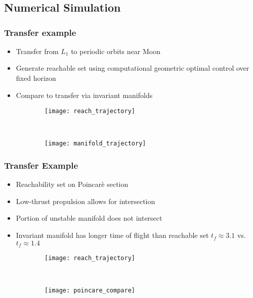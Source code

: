 \section*{}
\subsection*{Numerical Simulation}
\begin{frame} %
\frametitle{Transfer example}
\begin{itemize}
	\item Transfer from \( L_1 \) to periodic orbits near Moon
	\item Generate reachable set using computational geometric optimal control over fixed horizon
	\item Compare to transfer via invariant manifolds
\end{itemize}
	\begin{figure} 
	\centering 
	\begin{subfigure}[htbp]{0.5\textwidth} 
		\texttt{[image: reach\_trajectory]}  
	\end{subfigure}~
	\begin{subfigure}[htbp]{0.5\textwidth} 
		\texttt{[image: manifold\_trajectory]} 
	\end{subfigure} 
	\end{figure}
\end{frame} %

\begin{frame}%
\frametitle{Transfer Example}
\begin{itemize}
	\item Reachability set on Poincar\`e section
	\item Low-thrust propulsion allows for intersection
	\item Portion of unstable manifold does not intersect
	\item Invariant manifold has longer time of flight than reachable set \( t_f \approx 3.1 \) vs. \( t_f \approx 1.4 \)
\end{itemize}
	\begin{figure} 
	\centering 
	\begin{subfigure}[htbp]{0.5\textwidth} 
		\texttt{[image: reach\_trajectory]}  
	\end{subfigure}~
	\begin{subfigure}[htbp]{0.5\textwidth} 
		\texttt{[image: poincare\_compare]} 
	\end{subfigure} 
	\end{figure}

\end{frame} %